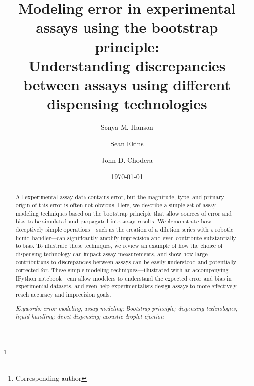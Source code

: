 \documentclass[aps,pre,twocolumn,nofootinbib,superscriptaddress,linenumbers]{revtex4-1}
\begin{document}
\title{Modeling error in experimental assays using the bootstrap principle:\\
Understanding discrepancies between assays using different dispensing technologies}

\author{Sonya M. Hanson}
\author{Sean Ekins}
\author{John D. Chodera}
 \thanks{Corresponding author}

\date{\today}

\begin{abstract}

All experimental assay data contains error, but the magnitude, type, and primary origin of this error is often not obvious.
Here, we describe a simple set of assay modeling techniques based on the bootstrap principle that allow sources of error and bias to be simulated and propagated into assay results.
We demonstrate how deceptively simple operations---such as the creation of a dilution series with a robotic liquid handler---can significantly amplify imprecision and even contribute substantially to bias.
To illustrate these techniques, we review an example of how the choice of dispensing technology can impact assay measurements, and show how large contributions to discrepancies between assays can be easily understood and potentially corrected for.
These simple modeling techniques---illustrated with an accompanying IPython notebook---can allow modelers to understand the expected error and bias in experimental datasets, and even help experimentalists design assays to more effectively reach accuracy and imprecision goals.

\emph{Keywords: error modeling; assay modeling; Bootstrap principle; dispensing technologies; liquid handling; direct dispensing; acoustic droplet ejection}
\end{abstract}
\end{document}
